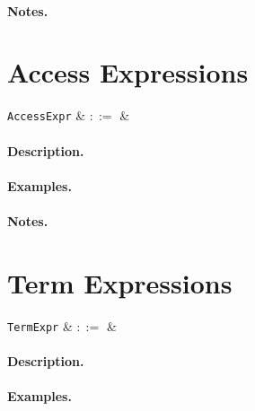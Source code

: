 \paragraph{Notes.} 


\section{Access Expressions}
\label{c_expr_access}

\begin{syntax}
  \verb+AccessExpr+ & $::=$ &\\
\end{syntax}

\paragraph{Description.}

\paragraph{Examples.}

\paragraph{Notes.} 


\section{Term Expressions}
\label{c_expr_term}

\begin{syntax}
  \verb+TermExpr+ & $::=$ &\\
\end{syntax}

\paragraph{Description.}

\paragraph{Examples.}

